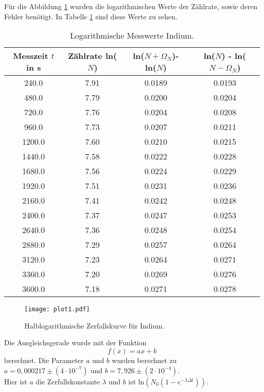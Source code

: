 Für die Abbildung \ref{fig:plot1} wurden die logarithmischen Werte der Zählrate, sowie deren Fehler benötigt.
In Tabelle \ref{tab:lnN1} sind diese Werte zu sehen.

\begin{table}
  \centering
  \caption{Logarithmische Messwerte Indium.}
  \label{tab:lnN1}
\begin{tabular}{c c c c}
  \toprule
  Messzeit $t$ in s & Zählrate ln($N$) & ln($N + \Omega_N$)- ln($N$) & ln($N$) - ln($N - \Omega_N$)\\
  \midrule
  240.0 & 7.91 & 0.0189 & 0.0193 \\
  480.0 & 7.79 & 0.0200 & 0.0204 \\
  720.0 & 7.76 & 0.0204 & 0.0208 \\
  960.0 & 7.73 & 0.0207 & 0.0211 \\
  1200.0 & 7.60 & 0.0210 & 0.0215 \\
  1440.0 & 7.58 & 0.0222 & 0.0228 \\
  1680.0 & 7.56 & 0.0224 & 0.0229 \\
  1920.0 & 7.51 & 0.0231 & 0.0236 \\
  2160.0 & 7.41 & 0.0242 & 0.0248 \\
  2400.0 & 7.37 & 0.0247 & 0.0253 \\
  2640.0 & 7.36 & 0.0248 & 0.0254 \\
  2880.0 & 7.29 & 0.0257 & 0.0264 \\
  3120.0 & 7.23 & 0.0264 & 0.0271 \\
  3360.0 & 7.20 & 0.0269 & 0.0276 \\
  3600.0 & 7.18 & 0.0271 & 0.0278 \\
  \bottomrule
\end{tabular}
\end{table}
\FloatBarrier

\begin{figure}
  \centering
  \texttt{[image: plot1.pdf]}
  \caption{Halblogarithmische Zerfallskurve für Indium.}
  \label{fig:plot1}
\end{figure}
\FloatBarrier

Die Ausgleichsgerade wurde mit der Funktion
\begin{equation}
  f(x) = ax +b
  \label{eqn:glFit}
\end{equation}
berechnet.
Die Parameter $a$ und $b$ wurden berechnet zu $a = 0,000217 \pm (4 \cdot 10^{-7})$ und $b = 7,926 \pm (2 \cdot 10^{-4})$. \\
Hier ist $a$ die Zerfallskonstante $\lambda$ und $b$ ist $\text{ln}(N_0(1-e^{-\lambda \Delta t}))$. \\

